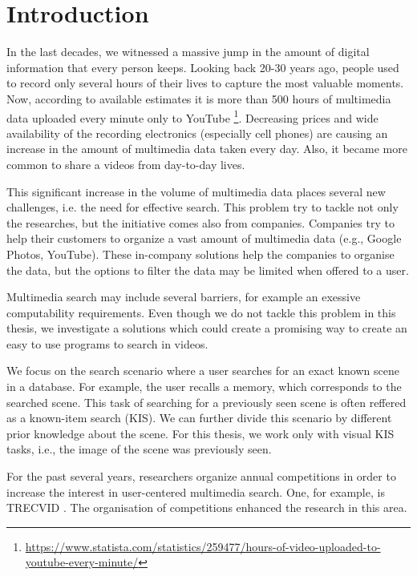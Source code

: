 \chapter*{Introduction}

In the last decades, we witnessed a massive jump in the amount of digital information that every person keeps. Looking back 20-30 years ago, people used to record only several hours of their lives to capture the most valuable moments. Now, according to available estimates it is more than 500 hours of multimedia data uploaded every minute only to YouTube \footnote{\href{https://www.statista.com/statistics/259477/hours-of-video-uploaded-to-youtube-every-minute/}{https://www.statista.com/statistics/259477/hours-of-video-uploaded-to-youtube-every-minute/}}. Decreasing prices and wide availability of the recording electronics (especially cell phones) are causing an increase in the amount of multimedia data taken every day. Also, it became more common to share a videos from day-to-day lives.

This significant increase in the volume of multimedia data places several new challenges, i.e. the need for effective search. This problem try to tackle not only the researches, but the initiative comes also from companies. Companies try to help their customers to organize a vast amount of multimedia data (e.g., Google Photos, YouTube). These in-company solutions help the companies to organise the data, but the options to filter the data may be limited when offered to a user.

Multimedia search may include several barriers, for example an exessive computability requirements. Even though we do not tackle this problem in this thesis, we investigate a solutions which could create a promising way to create an easy to use programs to search in videos.

We focus on the search scenario where a user searches for an exact known scene in a database. For example, the user recalls a memory, which corresponds to the searched scene. This task of searching for a previously seen scene is often reffered as a known-item search (KIS). We can further divide this scenario by different prior knowledge about the scene. For this thesis, we work only with visual KIS tasks, i.e., the image of the scene was previously seen.

For the past several years, researchers organize annual competitions in order to increase the interest in user-centered multimedia search. One, for example, is TRECVID . The organisation of competitions enhanced the research in this area.

